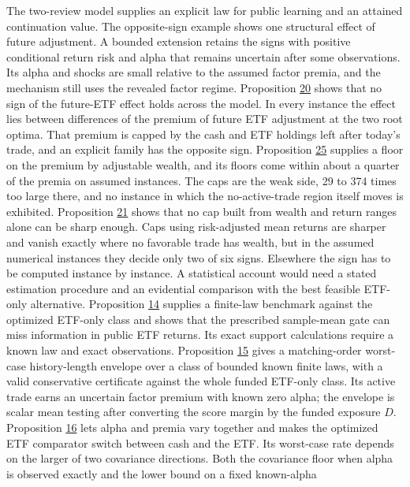 \documentclass[11pt]{article}
\begin{document}
The two-review model supplies an explicit law for public learning
and an attained continuation value. The opposite-sign example
shows one structural effect of future adjustment. A bounded
extension retains the signs with positive conditional return
risk and alpha that remains uncertain after some observations.
Its alpha and shocks are small relative to the assumed factor
premia, and the mechanism still uses the revealed factor regime.
Proposition \hyperref[res:Proposition-20]{20} shows that no sign of the future-ETF effect holds
across the model. In every instance the effect lies between
differences of the premium of future ETF adjustment at the two
root optima. That premium is capped by the cash and ETF holdings
left after today's trade, and an explicit family has the
opposite sign. Proposition \hyperref[res:Proposition-25]{25} supplies a floor on the premium by
adjustable wealth, and its floors come within about a quarter of
the premia on assumed instances. The caps are the weak side, 29 to
374 times too large there, and no instance in which the
no-active-trade region itself moves is exhibited. Proposition \hyperref[res:Proposition-21]{21}
shows that no cap built from wealth and return ranges alone can be
sharp enough. Caps using risk-adjusted mean returns are sharper and
vanish exactly where no favorable trade has wealth, but in the
assumed numerical instances they decide only two of six signs.
Elsewhere the sign has to be computed instance by instance.
A statistical account would need a stated estimation procedure
and an evidential comparison with the best feasible ETF-only
alternative. Proposition \hyperref[res:Proposition-14]{14} supplies a finite-law benchmark
against the optimized ETF-only class and shows that the
prescribed sample-mean gate can miss information in public
ETF returns. Its exact support calculations require a known
law and exact observations. Proposition \hyperref[res:Proposition-15]{15} gives a matching-order
worst-case history-length envelope over a class of bounded known
finite laws, with a valid conservative certificate against the
whole funded ETF-only class. Its active trade earns an uncertain
factor premium with known zero alpha; the envelope is scalar
mean testing after converting the score margin by the funded
exposure \(D\). Proposition \hyperref[res:Proposition-16]{16} lets alpha and premia vary
together and makes the optimized ETF comparator switch between
cash and the ETF. Its worst-case rate depends on the larger of
two covariance directions. Both the covariance floor when alpha
is observed exactly and the lower bound on a fixed known-alpha
\end{document}
